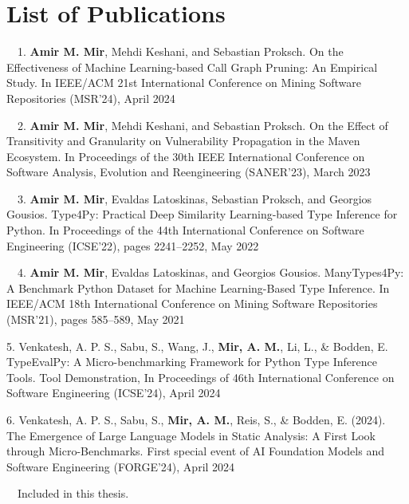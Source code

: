 \chapter*{List of Publications}
\label{publications}

\begin{etaremune}{\small
\item[\faFileTextO~~1.] \textbf{Amir M. Mir}, Mehdi Keshani, and Sebastian Proksch. On the Effectiveness of Machine Learning-based Call Graph Pruning: An Empirical Study. In IEEE/ACM 21st International Conference on Mining
Software Repositories (MSR'24), April 2024

\item[\faFileTextO~~2.] \textbf{Amir M. Mir}, Mehdi Keshani, and Sebastian Proksch. On the Effect of Transitivity and Granularity on Vulnerability Propagation in the Maven Ecosystem. In Proceedings of the 30th IEEE International
Conference on Software Analysis, Evolution and Reengineering (SANER'23), March 2023

\item[\faFileTextO~~3.] \textbf{Amir M. Mir}, Evaldas Latoskinas, Sebastian Proksch, and Georgios Gousios. Type4Py: Practical Deep Similarity Learning-based Type Inference for Python. In Proceedings of the 44th International Conference on
Software Engineering (ICSE'22), pages 2241–2252, May 2022

\item[\faFileTextO~~4.] \textbf{Amir M. Mir}, Evaldas Latoskinas, and Georgios Gousios. ManyTypes4Py: A Benchmark Python Dataset for
Machine Learning-Based Type Inference. In IEEE/ACM 18th International Conference on Mining Software Repositories (MSR'21), pages 585–589, May 2021

\item[5.] Venkatesh, A. P. S., Sabu, S., Wang, J., \textbf{Mir, A. M.}, Li, L., \& Bodden, E. TypeEvalPy: A Micro-benchmarking Framework for Python Type Inference Tools. Tool Demonstration, In Proceedings of 46th International Conference on Software Engineering (ICSE'24), April 2024

\item[6.] Venkatesh, A. P. S., Sabu, S., \textbf{Mir, A. M.}, Reis, S., \& Bodden, E. (2024). The Emergence of Large Language Models in Static Analysis: A First Look through Micro-Benchmarks. First special event of AI Foundation Models and Software Engineering (FORGE'24), April 2024
}
\end{etaremune}

\vspace{0.5cm}
\noindent
\faFileTextO~~Included in this thesis.\\
